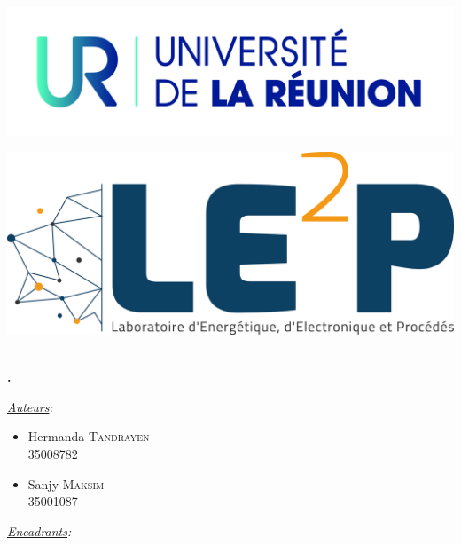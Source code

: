 \documentclass[11pt,oneside]{article}
\begin{document}
\begin{titlepage}
\phantom{aaaaaaaaaaaaaaaaaaaaaaaaaaaaaaaaaaaaaaa
ytrfdytfugvghikuhjbiujbhaaaaaaaaaaaaaaa}


\begin{minipage}[c]{.46\linewidth}
		\centering
		\includegraphics[scale=0.1]{logo} 
	\end{minipage}
\hfill%
\begin{minipage}[c]{.46\linewidth}
		\centering
		\includegraphics[scale=0.04]{LE2P} 
\end{minipage}



\phantom{aaaaaaaaaaaaaaaaaaaaaaaaaaaaaaaaaaaaaaa
ytrfdytfugvghikuhjbiujbhaaaaaaaaaaaaaaa}
\center
\fbox{\begin{minipage}[t][1cm][c]{8cm}
\begin{center}
{\huge \bfseries \textcolor{Rapport}{Feuille de Route}}
\end{center}
\end{minipage}}\\[0.5cm]
\textbf{\Large \color{Mulberry} .}\\[0.5cm] 
\begin{minipage}{0.5\textwidth}
\begin{flushleft} \large
\hspace{0.22\textwidth}\emph{\underline{Auteurs}:}\\
\begin{multicols}{2}
\begin{itemize}[font=\color{airforceblue} \Large, label=, leftmargin=0cm]
\item{Hermanda \textsc{Tandrayen} \\ {\small{35008782}}}
\item{Sanjy \textsc{Maksim} \\ {\small{35001087}}}
\end{itemize}
\end{multicols}
\end{flushleft}
\end{minipage}
\begin{minipage}{0.45\textwidth}
\begin{flushright} \large
\emph{\underline{Encadrants}:}\phantom{aaaaa}\\


\end{flushright}
\end{minipage}
\end{titlepage}
\end{document}
